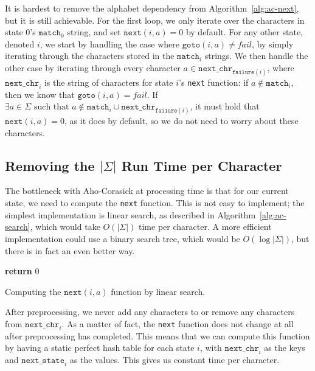 \documentclass[ %
                    author={Dominic Joseph Moylett},
                    degree={MEng},
                     title={Dictionary Matching with Fingerprints},
                  subtitle={An Empirical Analysis},
                      type={research},
                      year={2015} ]{dissertation}
\begin{document}
It is hardest to remove the alphabet dependency from Algorithm~\ref{alg:ac-next}, but it is still achievable. For the first loop, we only iterate over the characters in state 0's $\texttt{match}_{0}$ string, and set $\texttt{next}(i, a) = 0$ by default. For any other state, denoted $i$, we start by handling the case where $\texttt{goto}(i, a) \neq fail$, by simply iterating through the characters stored in the $\texttt{match}_i$ strings. We then handle the other case by iterating through every character $a \in \texttt{next\_chr}_{\texttt{failure}(i)}$, where $\texttt{next\_chr}_i$ is the string of characters for state $i$'s \texttt{next} function: if $a \notin \texttt{match}_i$, then we know that $\texttt{goto}(i, a) = fail$. If $\exists a \in \Sigma \text{ such that } a \notin \texttt{match}_i \cup \texttt{next\_chr}_{\texttt{failure}(i)}$, it must hold that $\texttt{next}(i, a) = 0$, as it does by default, so we do not need to worry about these characters.

\subsection{Removing the $|\Sigma|$ Run Time per Character}

The bottleneck with Aho-Corasick at processing time is that for our current state, we need to compute the \texttt{next} function. This is not easy to implement; the simplest implementation is linear search, as described in Algorithm~\ref{alg:ac-search}, which would take $O(|\Sigma|)$ time per character. A more efficient implementation could use a binary search tree, which would be $O(\log|\Sigma|)$, but there is in fact an even better way.

\begin{algorithm}[t]
{\bf return} 0
\caption{Computing the $\texttt{next}(i, a)$ function by linear search.}
\label{alg:ac-search}
\end{algorithm}

After preprocessing, we never add any characters to or remove any characters from $\texttt{next\_chr}_i$. As a matter of fact, the \texttt{next} function does not change at all after preprocessing has completed. This means that we can compute this function by having a static perfect hash table for each state $i$, with $\texttt{next\_chr}_i$ as the keys and $\texttt{next\_state}_i$ as the values. This gives us constant time per character.
\end{document}
